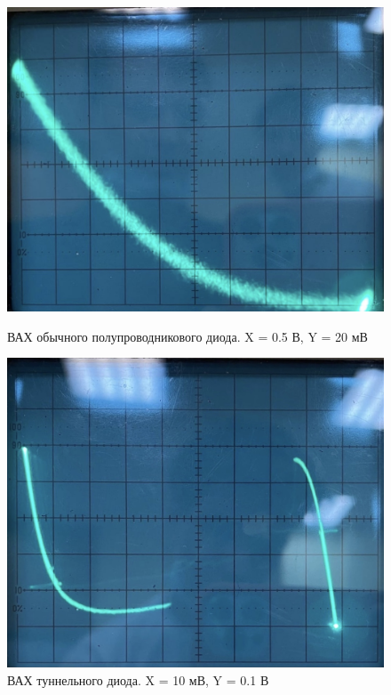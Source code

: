 \documentclass[a4paper]{article}
\begin{document}
\begin{figure}[H]
    \begin{center}
    \begin{minipage}[h]{0.45\linewidth}
        \includegraphics[width=1\linewidth]{vah1.jpg}
        \caption{ВАХ обычного полупроводникового диода. X = 0.5 В, Y = 20 мВ}
        \label{vah1}
    \end{minipage}
    \hfill 
    \begin{minipage}[h]{0.45\linewidth}
        \includegraphics[width=1\linewidth]{vah2.jpg}
        \caption{ВАХ туннельного диода. X = 10 мВ, Y = 0.1 В}
        \label{vah2}
    \end{minipage}
    \end{center}
\end{figure}
\end{document}
